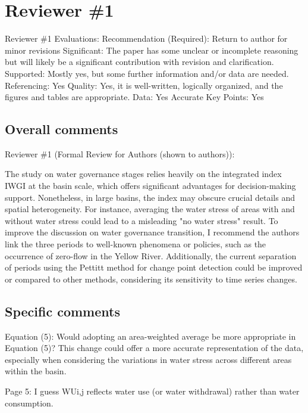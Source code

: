 \section{Reviewer \#1}\label{reviewer_1}

Reviewer \#1 Evaluations:
Recommendation (Required): Return to author for minor revisions
Significant: The paper has some unclear or incomplete reasoning but will likely be a significant contribution with revision and clarification.
Supported: Mostly yes, but some further information and/or data are needed.
Referencing: Yes
Quality: Yes, it is well-written, logically organized, and the figures and tables are appropriate.
Data: Yes
Accurate Key Points: Yes

\subsection*{Overall comments}

Reviewer \#1 (Formal Review for Authors (shown to authors)):

The study on water governance stages relies heavily on the integrated index IWGI at the basin scale, which offers significant advantages for decision-making support. Nonetheless, in large basins, the index may obscure crucial details and spatial heterogeneity. For instance, averaging the water stress of areas with and without water stress could lead to a misleading "no water stress" result. To improve the discussion on water governance transition, I recommend the authors link the three periods to well-known phenomena or policies, such as the occurrence of zero-flow in the Yellow River.
Additionally, the current separation of periods using the Pettitt method for change point detection could be improved or compared to other methods, considering its sensitivity to time series changes.

\subsection*{Specific comments}

Equation (5): Would adopting an area-weighted average be more appropriate in Equation (5)? This change could offer a more accurate representation of the data, especially when considering the variations in water stress across different areas within the basin.

Page 5: I guess WUi,j reflects water use (or water withdrawal) rather than water consumption.

